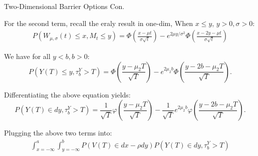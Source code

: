 \documentclass{beamer}
\begin{document}
\begin{frame}{Two-Dimensional Barrier Options Con.}

    {\footnotesize \footnotesize
    \par For the second term, recall the eraly result in one-dim, When \( x \leq y \), $y > 0,  \sigma > 0$:
    \begin{align*}
        P(W_{\mu, \sigma}(t) \leq x,  M_t \leq y) = \Phi \left( \frac{x - \mu t}{\sigma \sqrt{t}} \right) - e^{2\mu y / \sigma^2} 
         \Phi \left( \frac{x - 2y - \mu t}{\sigma \sqrt{t}} \right)
    \end{align*}
    \par We have for all \( y < b,  b > 0 \):
            \[
        P(Y(T) \leq y,  \tau_b^Y > T) = \Phi \left( \frac{y - \mu_2 T}{\sqrt{T}} \right) - e^{2\mu_2 b} \Phi \left( \frac{y - 2b - \mu_2 T}{\sqrt{T}} \right).
        \]
    \par Differentiating the above equation yields:
        \[
        P(Y(T) \in dy,  \tau_b^Y > T) = \frac{1}{\sqrt{T}} \varphi \left( \frac{y - \mu_2 T}{\sqrt{T}} \right) - \frac{1}{\sqrt{T}} e^{2\mu_2 b} \varphi \left( \frac{y - 2b - \mu_2 T}{\sqrt{T}} \right).
        \]
    \par  Plugging the above two terms into:
    \begin{align*}
        \int_{x=-\infty}^{a} \int_{y=-\infty}^{b} P(V(T) \in dx - \rho dy) P(Y(T) \in dy,  \tau_b^Y > T)
    \end{align*}
    }

\end{frame}
\end{document}
